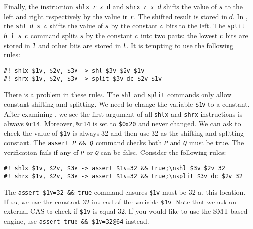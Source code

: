 \documentclass{amsproc}
\begin{document}
Finally, the \xeightysix instruction \texttt{shlx \textit{r}
  \textit{s} \texttt{d}} and \texttt{shrx \textit{r} \textit{s}
  \textit{d}} shifts the value of \texttt{\textit{s}} to the left and
right respectively by the value in \texttt{\textit{r}}. The shifted
result is stored in \texttt{\textit{d}}. In \cryptoline, the
\texttt{shl \textit{d} \textit{s} \textit{c}} shifts the value of
\texttt{\textit{s}} by the constant \texttt{\textit{c}} bits to the
left. The \texttt{split \textit{h} \textit{l} \textit{s} \textit{c}}
command splits \texttt{\textit{s}} by the constant \texttt{\textit{c}}
into two parts: the lowest \texttt{\textit{c}} bits are stored in
\texttt{\textit{l}} and other bits are stored in \texttt{\textit{h}}.
It is tempting to use the following rules:
\begin{verbatim}
#! shlx $1v, $2v, $3v -> shl $3v $2v $1v
#! shrx $1v, $2v, $3v -> split $3v dc $2v $1v
\end{verbatim}
There is a problem in these rules. The \texttt{shl} and
\texttt{split} commands only allow constant shifting and splitting. We
need to change the variable \texttt{\$1v} to a constant. After
examining \nistzmul, we see the first argument of all \texttt{shlx}
and \texttt{shrx} instructions is always \texttt{\%r14}. Moreover,
\texttt{\%r14} is set to \texttt{\$0x20} and never changed. We can ask
\cryptoline to check the value of \texttt{\$1v} is always 32 and then
use 32 as the shifting and splitting constant. The \cryptoline
\texttt{assert \textit{P} \&\& \textit{Q}} command checks both
\texttt{\textit{P}} and \texttt{\textit{Q}} must be true. The
verification fails if any of \texttt{\textit{P}} or
\texttt{\textit{Q}} can be false. Consider the following rules:
\begin{verbatim}
#! shlx $1v, $2v, $3v -> assert $1v=32 && true;\nshl $3v $2v 32
#! shrx $1v, $2v, $3v -> assert $1v=32 && true;\nsplit $3v dc $2v 32
\end{verbatim}
The \texttt{assert \$1v=32 \&\& true} command ensures \texttt{\$1v}
must be 32 at this location. If so, we use the constant 32 instead of
the variable \texttt{\$1v}. Note that we ask an external CAS to check
if \texttt{\$1v} is equal 32. If you would like to use the SMT-based
engine, use \texttt{assert true \&\& \$1v=32@64} instead.
\end{document}
